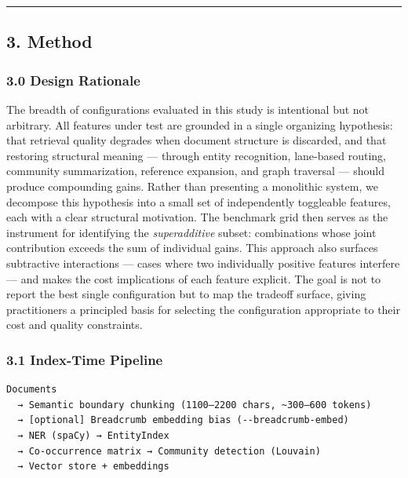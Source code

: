 \begin{center}\rule{0.5\linewidth}{0.5pt}\end{center}

\subsection{3. Method}\label{method}

\subsubsection{3.0 Design Rationale}\label{design-rationale}

The breadth of configurations evaluated in this study is intentional but not arbitrary. All features under test are grounded in a single organizing hypothesis: that retrieval quality degrades when document structure is discarded, and that restoring structural meaning --- through entity recognition, lane-based routing, community summarization, reference expansion, and graph traversal --- should produce compounding gains. Rather than presenting a monolithic system, we decompose this hypothesis into a small set of independently toggleable features, each with a clear structural motivation. The benchmark grid then serves as the instrument for identifying the \emph{superadditive} subset: combinations whose joint contribution exceeds the sum of individual gains. This approach also surfaces subtractive interactions --- cases where two individually positive features interfere --- and makes the cost implications of each feature explicit. The goal is not to report the best single configuration but to map the tradeoff surface, giving practitioners a principled basis for selecting the configuration appropriate to their cost and quality constraints.

\subsubsection{3.1 Index-Time Pipeline}\label{index-time-pipeline}

\begin{verbatim}
Documents
  → Semantic boundary chunking (1100–2200 chars, ~300–600 tokens)
  → [optional] Breadcrumb embedding bias (--breadcrumb-embed)
  → NER (spaCy) → EntityIndex
  → Co-occurrence matrix → Community detection (Louvain)
  → Vector store + embeddings
\end{verbatim}


